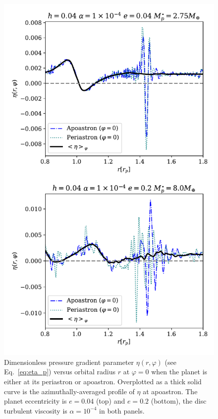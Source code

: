 \documentclass[fleqn,usenatbib]{mnras}
\begin{document}
\begin{figure}
   \includegraphics[width=1.0\linewidth]{eta_phi_.pdf}
  \caption{Dimensionless pressure gradient parameter $\eta(r,\varphi)$ (see Eq.~\ref{eq:eta_p}) versus orbital radius $r$ at $\varphi=0$ when the planet is either at its periastron or apoastron. Overplotted as a thick solid curve is the azimuthally-averaged profile of $\eta$ at apoastron. The planet eccentricity is $e=0.04$ (top) and $e=0.2$ (bottom), the disc turbulent viscosity is $\alpha=10^{-4}$ in both panels.}
  \label{fig:eta}
\end{figure}
\end{document}
